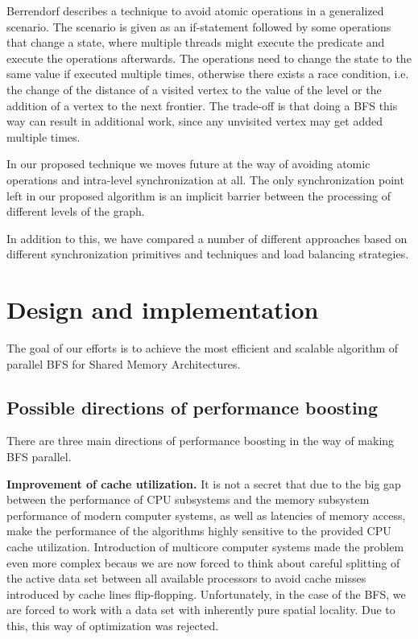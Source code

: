 \documentclass[letterpaper]{article}
\begin{document}
		Berrendorf\cite{Berrendorf:14} describes a technique to avoid atomic operations in a generalized scenario. 
		The scenario is given as an if-statement followed by some operations that change a state, where multiple threads might execute the predicate and execute the operations afterwards. 
		The operations need to change the state to the same value if executed multiple times, otherwise there exists a race condition, i.e. the change of the distance of a visited vertex to the value of the level or the addition of a vertex to the next frontier. 
		The trade-off is that doing a BFS this way can result in additional work, since any unvisited vertex may get added multiple times.
		
		In our proposed technique we moves future at the way of avoiding atomic operations and intra-level synchronization at all.   %
		The only synchronization point left in our proposed algorithm is an implicit barrier between the processing of different levels of the graph.
		
		In addition to this, we have compared a number of different approaches based on different synchronization primitives and techniques and load balancing strategies.
	
	
	\section{Design and implementation}\label{sec:deim} %
		The goal of our efforts is to achieve the most efficient and scalable algorithm of parallel BFS for Shared Memory Architectures. 

		\subsection{Possible directions of performance boosting}
			There are three main directions of performance boosting in the way of making BFS parallel.
			
			\textbf{Improvement of cache utilization.}
			It is not a secret that due to the big gap between the performance of CPU subsystems and the memory subsystem performance of modern computer systems, as well as latencies of memory access, make the performance of the algorithms highly sensitive to the provided CPU cache utilization. 
			Introduction of multicore computer systems made the problem even more complex becaus  we are now forced to think about careful splitting of the active data set between all available processors to avoid cache misses introduced by cache lines flip-flopping. 
			Unfortunately, in the case of the BFS, we are forced to work with a data set with inherently pure spatial locality. 
			Due to this, this way of optimization was rejected.
			
\end{document}
